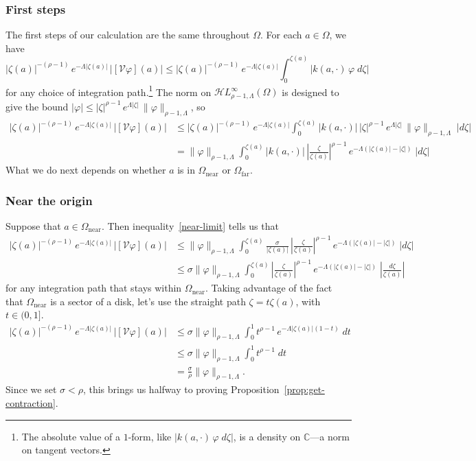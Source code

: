 \documentclass{article}
\theoremstyle{plain}
\newcommand{\C}{\mathbb{C}}
\newcommand{\singexp}[2]{\mathcal{H}L^\infty_{#1, #2}}
\newcommand{\volterra}{\mathcal{V}}
\newcommand{\domain}{\Omega}
\newcommand{\near}{\Omega_\text{near}}
\newcommand{\far}{\Omega_\text{far}}
\begin{document}
\subsubsection{First steps}\label{first-steps}
The first steps of our calculation are the same throughout $\domain$. For each $a \in \domain$, we have
\[ |\zeta(a)|^{-(\rho-1)}\,e^{-\Lambda|\zeta(a)|}\,|[\volterra\varphi](a)| \le |\zeta(a)|^{-(\rho-1)}\,e^{-\Lambda|\zeta(a)|} \int_0^{\zeta(a)} |k(a, \cdot)\,\varphi\;d\zeta| \]
for any choice of integration path.\footnote{The absolute value of a $1$-form, like $|k(a, \cdot)\,\varphi\;d\zeta|$, is a density on $\C$---a norm on tangent vectors.} The norm on $\singexp{\rho-1}{\Lambda}(\domain)$ is designed to give the bound $|\varphi| \le |\zeta|^{\rho-1}\,e^{\Lambda |\zeta|}\,\|\varphi\|_{\rho-1, \Lambda}$, so
\begin{align*}
|\zeta(a)|^{-(\rho-1)}\,e^{-\Lambda|\zeta(a)|}\,|[\volterra\varphi](a)| & \le |\zeta(a)|^{-(\rho-1)}\,e^{-\Lambda|\zeta(a)|} \int_0^{\zeta(a)} |k(a, \cdot)|\,|\zeta|^{\rho-1}\,e^{\Lambda |\zeta|}\,\|\varphi\|_{\rho-1, \Lambda}\;|d\zeta| \\
& = \|\varphi\|_{\rho-1, \Lambda} \int_0^{\zeta(a)} |k(a, \cdot)|\,\left|\frac{\zeta}{\zeta(a)}\right|^{\rho-1}\,e^{-\Lambda(|\zeta(a)| - |\zeta|)}\;|d\zeta|
\end{align*}
What we do next depends on whether $a$ is in $\near$ or $\far$.
\subsubsection{Near the origin}\label{near-bound}
Suppose that $a \in \near$. Then inequality~\eqref{near-limit} tells us that
\begin{align*}
|\zeta(a)|^{-(\rho-1)}\,e^{-\Lambda|\zeta(a)|}\,|[\volterra\varphi](a)| & \le
\|\varphi\|_{\rho-1, \Lambda} \int_0^{\zeta(a)} \frac{\sigma}{|\zeta(a)|}\,\left|\frac{\zeta}{\zeta(a)}\right|^{\rho-1}\,e^{-\Lambda(|\zeta(a)| - |\zeta|)}\;|d\zeta| \\
& \le \sigma \|\varphi\|_{\rho-1, \Lambda} \int_0^{\zeta(a)} \left|\frac{\zeta}{\zeta(a)}\right|^{\rho-1}\,e^{-\Lambda(|\zeta(a)| - |\zeta|)}\;\left|\frac{d\zeta}{\zeta(a)}\right|
\end{align*}
for any integration path that stays within $\near$. Taking advantage of the fact that $\near$ is a sector of a disk, let's use the straight path $\zeta = t \zeta(a)$, with $t \in (0, 1]$.
\begin{align*}
|\zeta(a)|^{-(\rho-1)}\,e^{-\Lambda|\zeta(a)|}\,|[\volterra\varphi](a)| & \le \sigma \|\varphi\|_{\rho-1, \Lambda} \int_0^1 t^{\rho-1}\,e^{-\Lambda |\zeta(a)|(1 - t)}\;dt \\
& \le \sigma \|\varphi\|_{\rho-1, \Lambda} \int_0^1 t^{\rho-1}\;dt \\
& = \frac{\sigma}{\rho} \|\varphi\|_{\rho-1, \Lambda}.
\end{align*}
Since we set $\sigma < \rho$, this brings us halfway to proving Proposition~\ref{prop:get-contraction}.
\end{document}
